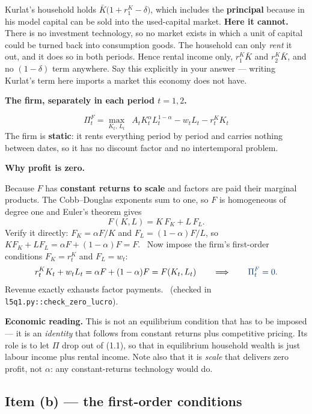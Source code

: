\documentclass[11pt, a4paper]{article}
\newcommand{\passo}[1]{\medskip\noindent\textbf{#1}\par\nobreak}
\newcommand{\intuicao}[1]{%
  \medskip\noindent\textcolor{midblue}{\textbf{Economic reading.}} #1\par}
\newcommand{\resp}[1]{%
  \ifmmode {\color{darkblue}#1}\else\textcolor{darkblue}{\textbf{#1}}\fi}
\newcommand{\Kb}{\bar K}
\begin{document}
\begin{tcolorbox}[trapbox, title={The one place this differs from Kurlat (9.1.1)}]
\small
Kurlat's household holds $\Kb\big(1+r^K_1-\delta\big)$, which includes the \textbf{principal}
because in his model capital can be sold into the used-capital market. \textbf{Here it
cannot.} There is no investment technology, so no market exists in which a unit of capital
could be turned back into consumption goods. The household can only \emph{rent} it out, and
it does so in both periods. Hence rental income only, $r^K_1\Kb$ and $r^K_2\Kb$, and no
$(1-\delta)$ term anywhere. Say this explicitly in your answer --- writing Kurlat's term
here imports a market this economy does not have.
\end{tcolorbox}

\passo{The firm, separately in each period $t=1,2$.}
\[
\Pi^F_t=\max_{K_t,\,L_t}\;\; A_t K_t^{\alpha}L_t^{1-\alpha}-w_tL_t-r^K_tK_t
\tag{1.2}
\]
The firm is \textbf{static}: it rents everything period by period and carries nothing
between dates, so it has no discount factor and no intertemporal problem.

\passo{Why profit is zero.} Because $F$ has \textbf{constant returns to scale} and factors
are paid their marginal products. The Cobb--Douglas exponents sum to one, so $F$ is
homogeneous of degree one and Euler's theorem gives
\[
F(K,L)=K\,F_K+L\,F_L .
\]
Verify it directly: $F_K=\alpha F/K$ and $F_L=(1-\alpha)F/L$, so
$K F_K+L F_L=\alpha F+(1-\alpha)F=F$. \checkmark\ Now impose the firm's first-order
conditions $F_K=r^K_t$ and $F_L=w_t$:
\[
r^K_t K_t+w_t L_t=\alpha F+(1-\alpha)F=F(K_t,L_t)
\qquad\Longrightarrow\qquad
\resp{\Pi^F_t=0 .}
\]
Revenue exactly exhausts factor payments. \checkmark\ (checked in
\texttt{l5q1.py::check\_zero\_lucro}).

\intuicao{This is not an equilibrium condition that has to be imposed --- it is an
\emph{identity} that follows from constant returns plus competitive pricing. Its role is to
let $\Pi$ drop out of (1.1), so that in equilibrium household wealth is just labour income
plus rental income. Note also that it is \emph{scale} that delivers zero profit, not
$\alpha$: any constant-returns technology would do.}

\subsection*{Item (b) --- the first-order conditions}
\end{document}
